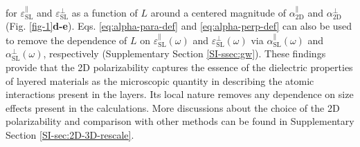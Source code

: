\documentclass[journal=ancac3,manuscript=article,email=true,hyperref=true,keywords=false]{achemso}
\begin{document}
for $\varepsilon_{\mathrm{SL}}^{\parallel}$ and $\varepsilon_{\mathrm{SL}}^{\perp}$ as a function of $L$ around 
a centered magnitude of $\alpha_{\mathrm{2D}}^{\parallel}$ 
and $\alpha_{\mathrm{2D}}^{\perp}$ (Fig. \ref{fig-1}{\bf d-e}). 
Eqs. \ref{eq:alpha-para-def} and \ref{eq:alpha-perp-def} can also be used to remove 
the dependence of $L$ on $\varepsilon^{\parallel}_{\mathrm{SL}}(\omega)$ and
$\varepsilon^{\perp}_{\mathrm{SL}}(\omega)$ via $\alpha^{\parallel}_{\mathrm{SL}}(\omega)$ and
$\alpha^{\perp}_{\mathrm{SL}}(\omega)$, respectively (Supplementary Section \ref{SI-ssec:gw}). 
%
% 
% 
% 
% 
These findings provide that the 2D polarizability captures the essence of the dielectric properties 
of layered materials as the microscopic quantity in describing the 
atomic interactions present in the layers. Its local nature removes any dependence on size effects 
present in the calculations.  
More discussions about the choice of the 2D polarizability
and comparison with other methods can be found in Supplementary Section \ref{SI-sec:2D-3D-rescale}. 


\end{document}
